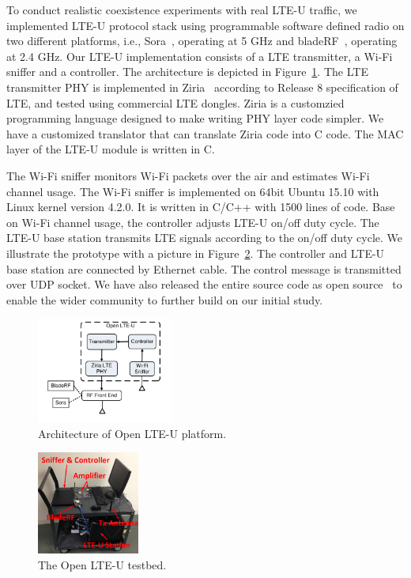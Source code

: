
To conduct realistic coexistence experiments with real LTE-U traffic, 
we implemented LTE-U protocol stack 
using programmable software defined radio on two different platforms, 
i.e., Sora~\cite{sora}, operating at 5 GHz and bladeRF~\cite{bladeRF}, operating at 2.4 GHz. 
Our LTE-U implementation consists of a LTE transmitter, a Wi-Fi sniffer and a controller.
The architecture is depicted in Figure~\ref{fig:platform}.
The LTE transmitter PHY is implemented in Ziria~\cite{stewart2015ziria} according to Release 8 specification of LTE, and tested using commercial LTE dongles. 
Ziria is a customzied programming language designed
to make writing PHY layer code simpler.  
We have a customized translator that 
can translate Ziria code into C code.
The MAC layer of the LTE-U module is written in C. 


The Wi-Fi sniffer monitors Wi-Fi packets over the air and estimates Wi-Fi channel usage.
The Wi-Fi sniffer is implemented on 64bit Ubuntu 15.10
with Linux kernel version 4.2.0. 
It is written in C/C++ with 1500 lines of code. 
Base on Wi-Fi channel usage, the controller adjusts LTE-U on/off duty cycle. 
The LTE-U base station transmits LTE signals according to the on/off duty cycle. 
We illustrate the prototype with a picture in Figure~\ref{fig:testbed}.
The controller and LTE-U base station are connected by
Ethernet cable. 
The control message is transmitted over UDP socket. 
We have also released the entire source code as open source~\cite{OpenLTEU} to enable the wider community to further build on our initial study.



\begin{figure}[!htb]
 \centering
     \includegraphics[width=0.4\textwidth]{./figures/architecture}
     \vspace{0.0cm}
     \caption{Architecture of Open LTE-U platform.}
   \label{fig:platform}
\end{figure}

\begin{figure}[!htb]
 \centering
     \includegraphics[width=0.3\textwidth]{./figures/testbed.png}
  \caption{The Open LTE-U testbed.}
   \label{fig:testbed}
\end{figure}


